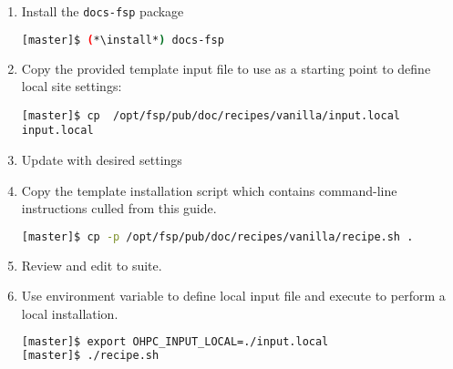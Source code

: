 \begin{enumerate}
\item Install the \texttt{docs-fsp} package

\begin{lstlisting}[language=bash,keywords={}]
[master]$ (*\install*) docs-fsp
\end{lstlisting}

\item Copy the provided template input file to use as a starting point to
  define local site settings:
\begin{lstlisting}
[master]$ cp  /opt/fsp/pub/doc/recipes/vanilla/input.local input.local
\end{lstlisting}

\item Update  with desired settings

\item Copy the template installation script which contains command-line
  instructions culled from this guide.

\begin{lstlisting}[language=bash,keywords={}]
[master]$ cp -p /opt/fsp/pub/doc/recipes/vanilla/recipe.sh .
\end{lstlisting}

\item Review and edit  to suite.

\item Use environment variable to define local input file and execute
   to perform a local installation.

\begin{lstlisting}[language=bash,keywords={}]
[master]$ export OHPC_INPUT_LOCAL=./input.local
[master]$ ./recipe.sh
\end{lstlisting}
\end{enumerate}



